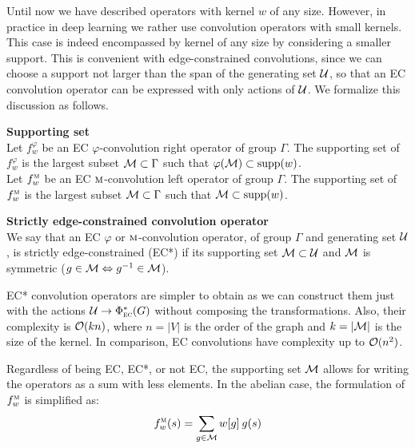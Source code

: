 Until now we have described operators with kernel $w$ of any size. However, in practice in deep learning we rather use convolution operators with small kernels. This case is indeed encompassed by kernel of any size by considering a smaller support. This is convenient with edge-constrained convolutions, since we can choose a support not larger than the span of the generating set $\cu$, so that an EC convolution operator can be expressed with only actions of $\cu$.
We formalize this discussion as follows.

\begin{definition}\textbf{Supporting set}\\
Let $f_w^\varphi$ be an EC $\varphi$-convolution right operator of group $\Gamma$. The supporting set of $f_w^\varphi$ is the largest subset $\cm \subset \Gamma$ such that $\varphi(\cm) \subset \supp(w)$.\\
Let $f_w^{\M}$ be an EC $\M$-convolution left operator of group $\Gamma$. The supporting set of $f_w^{\M}$ is the largest subset $\cm \subset \Gamma$ such that $\cm \subset \supp(w)$.
\end{definition}

\begin{definition}\textbf{Strictly edge-constrained convolution operator}\\
We say that an EC $\varphi$ or $\M$-convolution operator, of group $\Gamma$ and generating set $\cu$, is strictly edge-constrained (EC*) if its supporting set $\cm \subset \cu$ and $\cm$ is symmetric (\ie $g \in \cm \Leftrightarrow g^{-1} \in \cm$).
\label{def:ecc}
\end{definition}

\begin{remark}EC* convolution operators are simpler to obtain as we can construct them just with the actions $\cu \to \Phi^*_{\EC}(G)$ without composing the transformations. Also, their complexity is $\co(kn)$, where $n = |V|$ is the order of the graph and $k = |\cm|$ is the size of the kernel. In comparison, EC convolutions have complexity up to $\co(n^2)$.
\end{remark}

Regardless of being EC, EC*, or not EC, the supporting set $\cm$ allows for writing the operators as a sum with less elements. In the abelian case, the formulation of $f_w^{\M}$ is simplified as:
\begin{gather}
f_w^{\M}(s) = \displaystyle\sum_{g \in \cm} w[g] \h{2} g(s) \label{eq:secm}
\end{gather}

